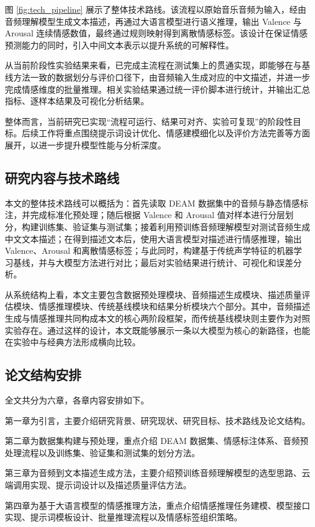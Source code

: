 图 \ref{fig:tech_pipeline} 展示了整体技术路线。该流程以原始音乐音频为输入，经由音频理解模型生成文本描述，再通过大语言模型进行语义推理，输出 Valence 与 Arousal 连续情感数值，最终通过规则映射得到离散情感标签。该设计在保证情感预测能力的同时，引入中间文本表示以提升系统的可解释性。

从当前阶段性实验结果来看，已完成主流程在测试集上的贯通实现，即能够在与基线方法一致的数据划分与评价口径下，由音频输入生成对应的中文描述，并进一步完成情感维度的批量推理。相关实验结果通过统一评价脚本进行统计，并输出汇总指标、逐样本结果及可视化分析结果。

整体而言，当前研究已实现“流程可运行、结果可对齐、实验可复现”的阶段性目标。后续工作将重点围绕提示词设计优化、情感建模细化以及评价方法完善等方面展开，以进一步提升模型性能与分析深度。

\subsection{研究内容与技术路线}
本文的整体技术路线可以概括为：首先读取 DEAM 数据集中的音频与静态情感标注，并完成标准化预处理；随后根据 Valence 和 Arousal 值对样本进行分层划分，构建训练集、验证集与测试集；接着利用预训练音频理解模型对测试音频生成中文文本描述；在得到描述文本后，使用大语言模型对描述进行情感推理，输出 Valence、Arousal 和离散情感标签；与此同时，构建基于传统声学特征的机器学习基线，并与大模型方法进行对比；最后对实验结果进行统计、可视化和误差分析。

从系统结构上看，本文主要包含数据预处理模块、音频描述生成模块、描述质量评估模块、情感推理模块、传统基线模块和结果分析模块六个部分。其中，音频描述生成与情感推理共同构成本文的核心两阶段框架，而传统基线模块则主要作为对照实验存在。通过这样的设计，本文既能够展示一条以大模型为核心的新路径，也能在实验中与经典方法形成横向比较。

\subsection{论文结构安排}
全文共分为六章，各章内容安排如下。

第一章为引言，主要介绍研究背景、研究现状、研究目标、技术路线及论文结构。

第二章为数据集构建与预处理，重点介绍 DEAM 数据集、情感标注体系、音频预处理流程以及训练集、验证集和测试集的划分方法。

第三章为音频到文本描述生成方法，主要介绍预训练音频理解模型的选型思路、云端调用实现、提示词设计以及描述质量评估方法。

第四章为基于大语言模型的情感推理方法，重点介绍情感推理任务建模、模型接口实现、提示词模板设计、批量推理流程以及情感标签组织策略。

